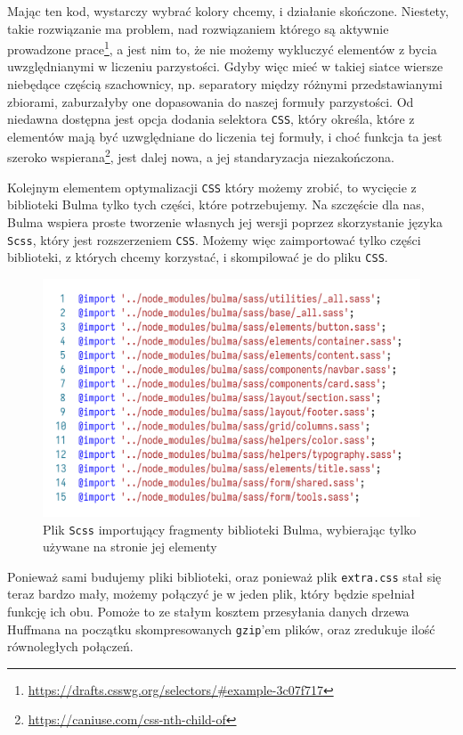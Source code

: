 \documentclass[licencjacka]{pracadypl}
\begin{document}
Mając ten kod, wystarczy wybrać kolory chcemy, i działanie skończone. Niestety, takie rozwiązanie ma problem, nad rozwiązaniem którego są aktywnie prowadzone prace\footnote{\url{https://drafts.csswg.org/selectors/\#example-3c07f717}}, a jest nim to, że nie możemy wykluczyć elementów z bycia uwzględnianymi w liczeniu parzystości. Gdyby więc mieć w takiej siatce wiersze niebędące częścią szachownicy, np. separatory między różnymi przedstawianymi zbiorami, zaburzałyby one dopasowania do naszej formuły parzystości. Od niedawna dostępna jest opcja dodania selektora \texttt{CSS}, który określa, które z elementów mają być uzwględniane do liczenia tej formuły, i choć funkcja ta jest szeroko wspierana\footnote{\url{https://caniuse.com/css-nth-child-of}}, jest dalej nowa, a jej standaryzacja niezakończona.

Kolejnym elementem optymalizacji \texttt{CSS} który możemy zrobić, to wycięcie z biblioteki Bulma tylko tych części, które potrzebujemy. Na szczęście dla nas, Bulma wspiera proste tworzenie własnych jej wersji poprzez skorzystanie języka \texttt{Scss}, który jest rozszerzeniem \texttt{CSS}. Możemy więc zaimportować tylko części biblioteki, z których chcemy korzystać, i skompilować je do pliku \texttt{CSS}.

\begin{figure}[H]
  \centering
  \includegraphics[width=\linewidth]{images/code-scss-import-bulma.png}
  \caption{Plik \texttt{Scss} importujący fragmenty biblioteki Bulma, wybierając tylko używane na stronie jej elementy}
  \label{fig:code-scss-import-bulma}
\end{figure}

Ponieważ sami budujemy pliki biblioteki, oraz ponieważ plik \texttt{extra.css} stał się teraz bardzo mały, możemy połączyć je w jeden plik, który będzie spełniał funkcję ich obu. Pomoże to ze stałym kosztem przesyłania danych drzewa Huffmana na początku skompresowanych \texttt{gzip}'em plików, oraz zredukuje ilość równoległych połączeń.
\end{document}
